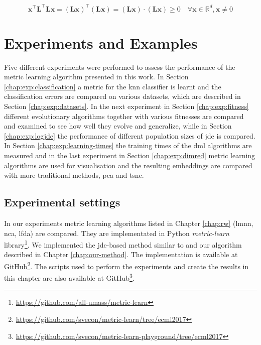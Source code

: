 \documentclass[12pt,a4paper]{report}
\begin{document}
\begin{equation}
\bm{x}^\top \bm{L}^\top \bm{L}\bm{x}=(\bm{Lx})^\top(\bm{Lx})=(\bm{Lx})\cdot (\bm{Lx})\geq 0 \quad \forall \bm{x} \in \mathbb{R}^d, \bm{x} \neq 0 \label{eq:mah:proof}
\end{equation}



\chapter{Experiments and Examples} \label{chap:exp}
Five different experiments were performed to assess the performance of the metric learning algorithm presented in this work. In Section \ref{chap:exp:classification} a metric for the \ac{knn} classifier is learnt and the classification errors are compared on various datasets, which are described in Section \ref{chap:exp:datasets}. In the next experiment in Section \ref{chap:exp:fitness} different evolutionary algorithms together with various fitnesses  are compared and examined to see how well they evolve and generalize, while in Section \ref{chap:exp:logjde} the performance of different population sizes of \ac{jde} is compared. In Section \ref{chap:exp:learning-times} the training times of the \ac{dml} algorithms are measured and in the last experiment in Section \ref{chap:exp:dimred} metric learning algorithms are used for visualisation and the resulting embeddings are compared with more traditional methods, \ac{pca} and \ac{tsne}.

\section{Experimental settings} 
In our experiments metric learning algorithms listed in Chapter \ref{chap:rw} (\ac{lmnn}, \ac{nca}, \ac{lfda}) are compared. They are implementated in Python \textit{metric-learn} library\footnote{\url{https://github.com/all-umass/metric-learn}}. We implemented the \ac{jde}-based method similar to \citep{fukui2013evolutionary} and our algorithm described in Chapter \ref{chap:our-method}. The implementation is available at GitHub\footnote{\url{https://github.com/svecon/metric-learn/tree/ecml2017}}. The scripts used to perform the experiments and create the results in this chapter are also available at GitHub\footnote{\url{https://github.com/svecon/metric-learn-playground/tree/ecml2017}}.
\end{document}
